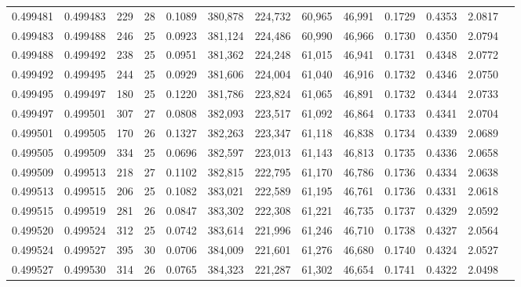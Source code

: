 \begin{tabular}{rrrrrrrrrrrrr}
0.499481 & 0.499483 & 229 &  28 &                                     0.1089 & 380,878 & 224,732 &  60,965 &  46,991 & 0.1729 & 0.4353 & 2.0817 \\
0.499483 & 0.499488 & 246 &  25 &                                     0.0923 & 381,124 & 224,486 &  60,990 &  46,966 & 0.1730 & 0.4350 & 2.0794 \\
0.499488 & 0.499492 & 238 &  25 &                                     0.0951 & 381,362 & 224,248 &  61,015 &  46,941 & 0.1731 & 0.4348 & 2.0772 \\
0.499492 & 0.499495 & 244 &  25 &                                     0.0929 & 381,606 & 224,004 &  61,040 &  46,916 & 0.1732 & 0.4346 & 2.0750 \\
0.499495 & 0.499497 & 180 &  25 &                                     0.1220 & 381,786 & 223,824 &  61,065 &  46,891 & 0.1732 & 0.4344 & 2.0733 \\
0.499497 & 0.499501 & 307 &  27 &                                     0.0808 & 382,093 & 223,517 &  61,092 &  46,864 & 0.1733 & 0.4341 & 2.0704 \\
0.499501 & 0.499505 & 170 &  26 &                                     0.1327 & 382,263 & 223,347 &  61,118 &  46,838 & 0.1734 & 0.4339 & 2.0689 \\
0.499505 & 0.499509 & 334 &  25 &                                     0.0696 & 382,597 & 223,013 &  61,143 &  46,813 & 0.1735 & 0.4336 & 2.0658 \\
0.499509 & 0.499513 & 218 &  27 &                                     0.1102 & 382,815 & 222,795 &  61,170 &  46,786 & 0.1736 & 0.4334 & 2.0638 \\
0.499513 & 0.499515 & 206 &  25 &                                     0.1082 & 383,021 & 222,589 &  61,195 &  46,761 & 0.1736 & 0.4331 & 2.0618 \\
0.499515 & 0.499519 & 281 &  26 &                                     0.0847 & 383,302 & 222,308 &  61,221 &  46,735 & 0.1737 & 0.4329 & 2.0592 \\
0.499520 & 0.499524 & 312 &  25 &                                     0.0742 & 383,614 & 221,996 &  61,246 &  46,710 & 0.1738 & 0.4327 & 2.0564 \\
0.499524 & 0.499527 & 395 &  30 &                                     0.0706 & 384,009 & 221,601 &  61,276 &  46,680 & 0.1740 & 0.4324 & 2.0527 \\
0.499527 & 0.499530 & 314 &  26 &                                     0.0765 & 384,323 & 221,287 &  61,302 &  46,654 & 0.1741 & 0.4322 & 2.0498 \\

\end{tabular}
